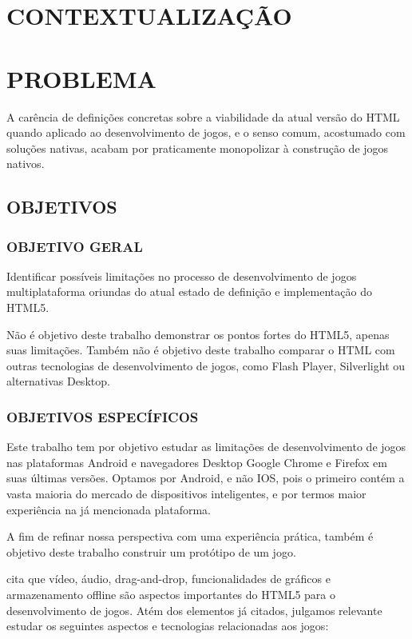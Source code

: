 \documentclass[
12pt,
a4paper,
portuges,
draft
]{report}
\begin{document}
{\listoffigures}
\clearpage
{\tableofcontents}
\chapter{CONTEXTUALIZAÇÃO}%

\chapter{PROBLEMA}
A carência de definições concretas sobre a viabilidade da atual
versão do HTML quando aplicado ao desenvolvimento de jogos, e o senso
comum, acostumado com soluções nativas, acabam por praticamente
monopolizar à construção de jogos nativos.
\section{OBJETIVOS}

\subsection{OBJETIVO GERAL}

Identificar possíveis limitações no processo de desenvolvimento
de jogos multiplataforma oriundas do atual estado de definição e
implementação do HTML5.

Não é objetivo deste trabalho demonstrar os pontos fortes do HTML5,
apenas suas limitações. Também não é objetivo deste trabalho
comparar o HTML com outras tecnologias de desenvolvimento de jogos, como
Flash Player, Silverlight ou alternativas Desktop.

\subsection{OBJETIVOS ESPECÍFICOS}

Este trabalho tem por objetivo estudar as limitações de
desenvolvimento de jogos nas plataformas Android e navegadores Desktop
Google Chrome e Firefox em suas últimas versões. Optamos por Android,
e não IOS, pois o primeiro contém a vasta maioria do mercado de
dispositivos inteligentes, e por termos maior experiência na já
mencionada plataforma.

A fim de refinar nossa perspectiva com uma experiência prática,
também é objetivo deste trabalho construir um protótipo de um jogo.

\cite{browserGamesTechnologyAndFuture} cita que vídeo, áudio,
drag-and-drop, funcionalidades de gráficos e armazenamento offline são
aspectos importantes do HTML5 para o desenvolvimento de jogos.
Atém dos elementos já citados, julgamos relevante estudar os seguintes
aspectos e tecnologias relacionadas aos jogos:
\end{document}
